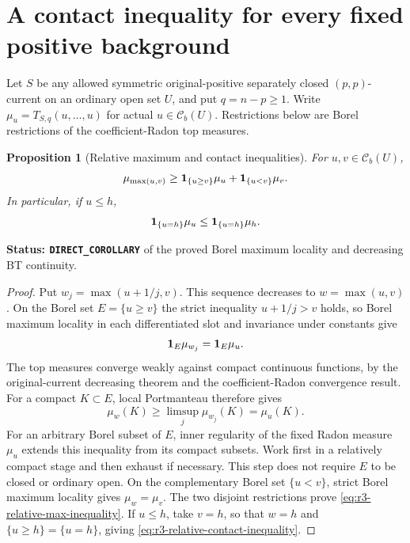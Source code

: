 \documentclass[11pt,a4paper]{article}
\numberwithin{equation}{section}
\newtheorem{proposition}[theorem]{Proposition}
\theoremstyle{definition}
\theoremstyle{remark}
\begin{document}


\section{A contact inequality for every fixed positive background}
\label{sec:r3-relative-contact-inequality}

Let $S$ be any allowed symmetric original-positive separately
closed $(p,p)$-current on an ordinary open set $U$, and put
$q=n-p\geq1$. Write $\mu_u=T_{S,q}(u,\ldots,u)$ for actual
$u\in\mathcal C_b(U)$. Restrictions below are Borel restrictions
of the coefficient-Radon top measures.

\begin{proposition}[Relative maximum and contact inequalities]
\label{prop:r3-relative-contact-inequality}
For $u,v\in\mathcal C_b(U)$,
\begin{equation}
 \mu_{\max(u,v)}
       \geq{\bf1}_{\{u\geq v\}}\mu_u
                  +{\bf1}_{\{u<v\}}\mu_v.
 \label{eq:r3-relative-max-inequality}
\end{equation}
In particular, if $u\leq h$,
\begin{equation}
 {\bf1}_{\{u=h\}}\mu_u
             \leq{\bf1}_{\{u=h\}}\mu_h.
 \label{eq:r3-relative-contact-inequality}
\end{equation}
\end{proposition}

\noindent\textbf{Status: \texttt{DIRECT\_COROLLARY}} of the
proved Borel maximum locality and decreasing BT continuity.

\begin{proof}
Put $w_j=\max(u+1/j,v)$. This sequence decreases to
$w=\max(u,v)$. On the Borel set $E=\{u\geq v\}$ the strict
inequality $u+1/j>v$ holds, so Borel maximum locality in each
differentiated slot and invariance under constants give
\begin{equation}
 {\bf1}_E\mu_{w_j}={\bf1}_E\mu_u.
 \label{eq:r3-contact-before-limit}
\end{equation}
The top measures converge weakly against compact continuous
functions, by the original-current decreasing theorem and the
coefficient-Radon convergence result. For a compact $K\subset E$,
local Portmanteau therefore gives
\[
 \mu_w(K)\geq\limsup_j\mu_{w_j}(K)=\mu_u(K).
\]
For an arbitrary Borel subset of $E$, inner regularity of the
fixed Radon measure $\mu_u$ extends this inequality from its
compact subsets. Work first in a relatively compact stage and
then exhaust if necessary. This step does not require $E$ to
be closed or ordinary open. On the complementary Borel set
$\{u<v\}$, strict Borel maximum locality gives
$\mu_w=\mu_v$. The two disjoint restrictions prove
\eqref{eq:r3-relative-max-inequality}.
If $u\leq h$, take $v=h$, so that $w=h$ and
$\{u\geq h\}=\{u=h\}$, giving
\eqref{eq:r3-relative-contact-inequality}.
\end{proof}
\end{document}
